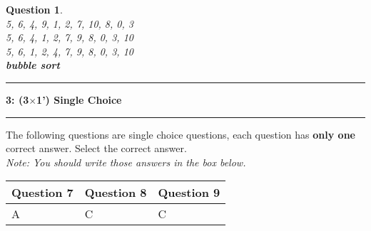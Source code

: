 \documentclass{article}
\newcommand\question[2]{\vspace{.25in}\hrule\textbf{#1: #2}\vspace{.5em}\hrule\vspace{.10in}}
\newtheorem{Q}{Question}
\begin{document}
\begin{Q}\textcolor{white}{ }\\
	5, 6, 4, 9, 1, 2, 7, 10, 8, 0, 3\\
	5, 6, 4, 1, 2, 7, 9, 8, 0, 3, 10\\
	5, 6, 1, 2, 4, 7, 9, 8, 0, 3, 10\\
	\textbf{bubble sort}

	\vspace{1cm}
\end{Q}

\pagebreak
\question{3}{(3$\times$1') Single Choice}
The following \textit{} questions are single choice questions, each question has \textbf{only one} correct answer. Select the correct answer.\\
\textit{Note: You should write those answers in the box below.}

\begin{table}[htbp]
	\begin{tabular}{|p{2cm}|p{2cm}|p{2cm}|}
		\hline
		Question 7 & Question 8 & Question 9 \\
		\hline
		A          & C          & C          \\
		\hline
	\end{tabular}
\end{table}
\end{document}
